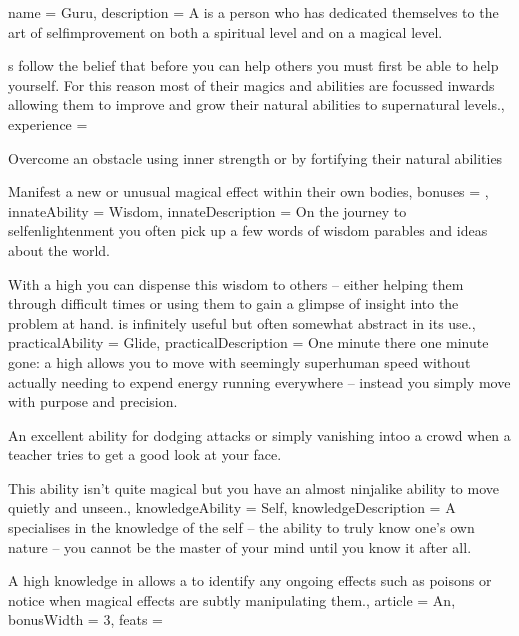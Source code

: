 \archetype
{
	name = Guru,
	description = A \bname{} is a person who has dedicated themselves to the art of self\minus{}improvement\comma{} on both a spiritual level\comma{} and on a magical level. 

\bname{}s follow the belief that before you can help others\comma{} you must first be able to help yourself. For this reason\comma{} most of their magics and abilities are focussed inwards\comma{} allowing them to improve and grow their natural abilities to supernatural levels.,
	experience = \item Overcome an obstacle using inner strength\comma{} or by fortifying their natural abilities
\item Manifest a new or unusual magical effect within their own bodies,
	bonuses = 
,
	innateAbility = Wisdom,
	innateDescription = On the journey to self\minus{}enlightenment\comma{} you often pick up a few words of wisdom\comma{} parables and ideas about the world. 

With a high \comma{} you can dispense this wisdom to others – either helping them through difficult times\comma{} or using them to gain a glimpse of insight into the problem at hand.  is infinitely useful\comma{} but often somewhat abstract in its use.,
	practicalAbility = Glide,
	practicalDescription = One minute there\comma{} one minute gone: a high  allows you to move with seemingly superhuman speed\comma{} without actually needing to expend energy running everywhere – instead you simply move with purpose and precision. 

An excellent ability for dodging attacks\comma{} or simply vanishing intoo a crowd when a teacher tries to get a good look at your face. 

This ability isn’t quite magical\comma{} but you have an almost ninja\minus{}like ability to move quietly and unseen.,
	knowledgeAbility = Self,
	knowledgeDescription = A \bname{} specialises in the knowledge of the self – the ability to truly know one’s own nature – you cannot be the master of your mind until you know it\comma{} after all. 

A high knowledge in  allows a \bname{} to identify any ongoing effects such as poisons\comma{} or notice when magical effects are subtly manipulating them.,
	article = An,
	bonusWidth = 3, feats = \GuruFeats
}

